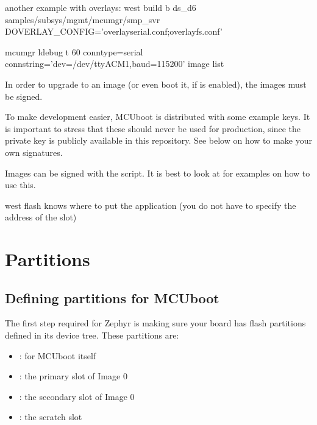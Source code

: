\documentclass[letterpaper,10pt,english]{sphinxmanual}
\begin{document}
another example with overlays:
west build \sphinxhyphen{}b ds\_d6 samples/subsys/mgmt/mcumgr/smp\_svr \textendash{} \sphinxhyphen{}DOVERLAY\_CONFIG=’overlay\sphinxhyphen{}serial.conf;overlay\sphinxhyphen{}fs.conf’

mcumgr \sphinxhyphen{}ldebug \sphinxhyphen{}t 60 \textendash{}conntype=serial \textendash{}connstring=’dev=/dev/ttyACM1,baud=115200’ image list

In order to upgrade to an image (or even boot it, if
 is enabled), the images must be signed.

To make development easier, MCUboot is distributed with some example
keys.  It is important to stress that these should never be used for
production, since the private key is publicly available in this
repository.  See below on how to make your own signatures.

Images can be signed with the  script.  It is best
to look at  for examples on how to use this.

west flash knows where to put the application (you do not have to specify the address of the slot)


\section{Partitions}
\label{\detokenize{fota/partitions:partitions}}\label{\detokenize{fota/partitions:signing}}\label{\detokenize{fota/partitions::doc}}
\begin{sphinxVerbatim}[commandchars=\\\{\}]
\end{sphinxVerbatim}


\subsection{Defining partitions for MCUboot}
\label{\detokenize{fota/partitions:defining-partitions-for-mcuboot}}
The first step required for Zephyr is making sure your board has flash
partitions defined in its device tree. These partitions are:
\begin{itemize}
\item {} 
: for MCUboot itself

\item {} 
: the primary slot of Image 0

\item {} 
: the secondary slot of Image 0

\item {} 
: the scratch slot

\end{itemize}
\end{document}
